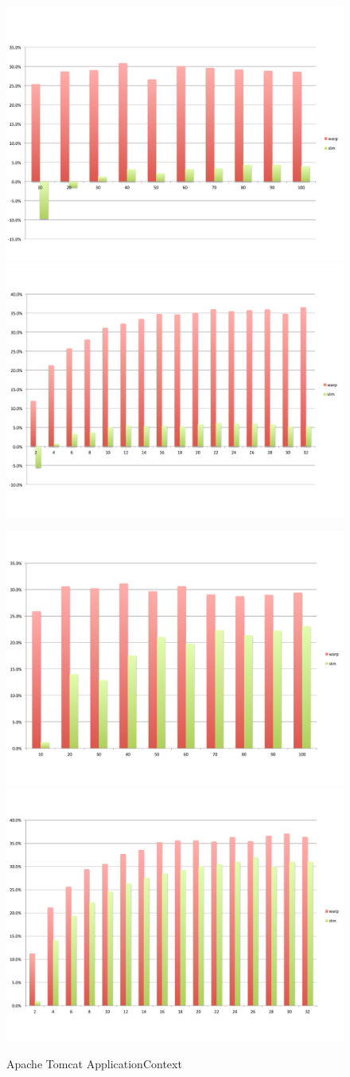 \begin{figure}
	\begin{minipage}{0.50 \textwidth}
		\includegraphics[width=0.5 \textwidth]{../../eval/32threads/case1it.pdf}\includegraphics[width=0.5 \textwidth]{../../eval/32threads/case1th.pdf}
		\caption{\label{Fi:case1th}Apache Tomcat {\sf ApplicationContext}}
	\end{minipage}
	\begin{minipage}{0.5 \textwidth}
		\includegraphics[width=0.5 \textwidth]{../../eval/32threads/case2it.pdf}\includegraphics[width=0.5 \textwidth]{../../eval/32threads/case2th.pdf}

\end{minipage}
\end{figure}
